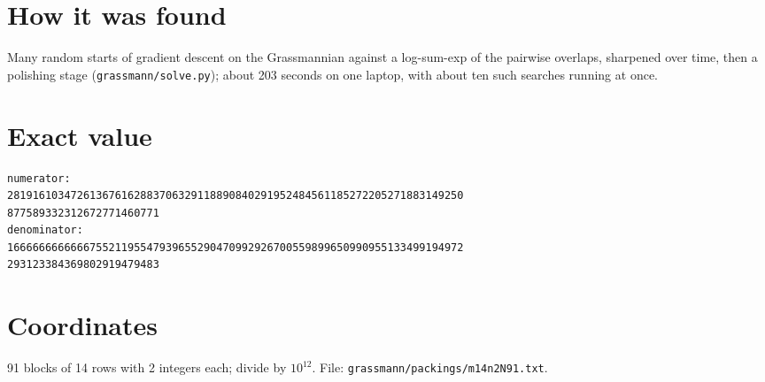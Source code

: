 \documentclass[11pt,a4paper]{article}
\begin{document}
\section{How it was found}
Many random starts of gradient descent on the Grassmannian against a log-sum-exp of the pairwise overlaps, sharpened over time, then a polishing stage (\texttt{grassmann/solve.py}); about 203 seconds on one laptop, with about ten such searches running at once.


\appendix
\section{Exact value}
{\small
\begin{verbatim}
numerator:
281916103472613676162883706329118890840291952484561185272205271883149250
877589332312672771460771
denominator:
166666666666675521195547939655290470992926700559899650990955133499194972
293123384369802919479483
\end{verbatim}}

\section{Coordinates}
91 blocks of 14 rows with 2 integers each; divide by $10^{12}$. File: \texttt{grassmann/packings/m14n2N91.txt}.
{\tiny
\begin{multicols}{4}
\end{multicols}}
\end{document}
